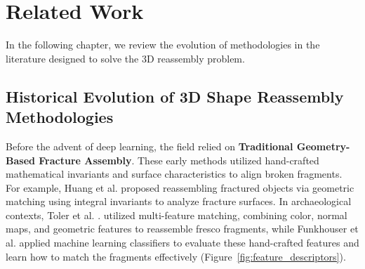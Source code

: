 \chapter{Related Work}
\label{chap:ch4}

In the following chapter, we review the evolution of methodologies in the literature designed to solve the 3D reassembly problem.

\section{Historical Evolution of 3D Shape Reassembly Methodologies}

Before the advent of deep learning, the field relied on \textbf{Traditional Geometry-Based Fracture Assembly}. These early methods utilized hand-crafted mathematical invariants and surface characteristics to align broken fragments. For example, Huang et al. \cite{huang2006reassembling} proposed reassembling fractured objects via geometric matching using integral invariants to analyze fracture surfaces. In archaeological contexts, Toler et al. \cite{toler2010multi}. utilized multi-feature matching, combining color, normal maps, and geometric features to reassemble fresco fragments, while Funkhouser et al. \cite{funkhouser2011learning} applied machine learning classifiers to evaluate these hand-crafted features and learn how to match the fragments effectively (Figure~\ref{fig:feature_descriptors}).

